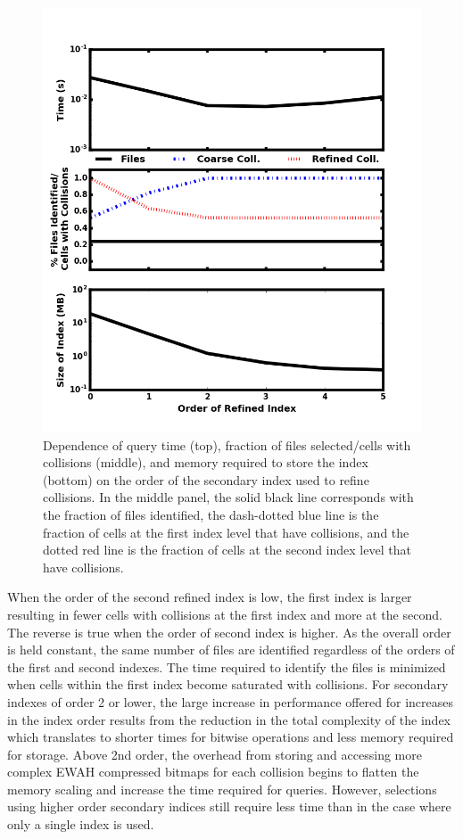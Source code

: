 \documentclass[apjl]{emulateapj}
\begin{document}
	\begin{figure}[htbp]
	\begin{center}
	\includegraphics[width=\columnwidth,keepaspectratio]{../images/vary_order2_to6.png}
	\caption{Dependence of query time (top), fraction of files selected/cells with collisions (middle), and memory required to store the index (bottom) on the order of the secondary index used to refine collisions. In the middle panel, the solid black line corresponds with the fraction of files identified, the dash-dotted blue line is the fraction of cells at the first index level that have collisions, and the dotted red line is the fraction of cells at the second index level that have collisions.}
	\label{fig:test_order2}
	\end{center}
	\end{figure}
\fi
%

When the order of the second refined index is low, the first index is larger resulting in fewer cells with collisions at the first index and more at the second. The reverse is true when the order of second index is higher. As the overall order is held constant, the same number of files are identified regardless of the orders of the first and second indexes. The time required to identify the files is minimized when cells within the first index become saturated with collisions. For secondary indexes of order 2 or lower, the large increase in performance offered for increases in the index order results from the reduction in the total complexity of the index which translates to shorter times for bitwise operations and less memory required for storage. Above 2nd order, the overhead from storing and accessing more complex EWAH compressed bitmaps for each collision begins to flatten the memory scaling and increase the time required for queries.  However, selections using higher order secondary indices still require less time than in the case where only a single index is used. 
\end{document}
